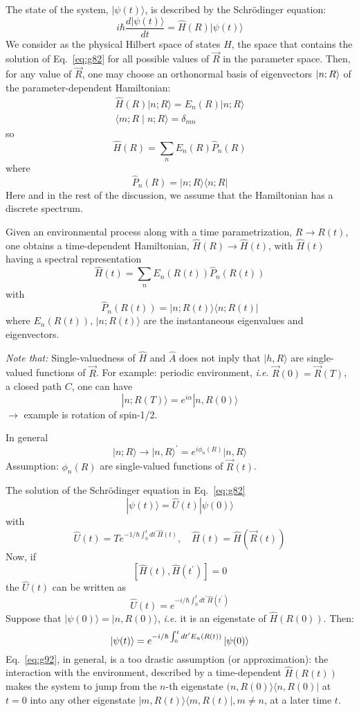 \documentclass[12pt]{article}
\newcommand{\be}{\begin{equation}}
\newcommand{\ee}{\end{equation}}
\begin{document}

The state of the system, $|\psi(t)\rangle$, is described by the
Schrödinger equation:
\be
i\hbar \frac{d|\psi(t)\rangle}{d t}=\hat{H}(R)|\psi(t)\rangle
\label{eq:g82}
\ee
We consider as the physical Hilbert space of states $H$,
the space that contains the solution of Eq.~\eqref{eq:g82}
for all possible values of $\vec{R}$ in the parameter
space. Then, for any value of $\vec{R}$, one may
choose an orthonormal basis of eigenvectors
$\ket{n;R}$ of the parameter-dependent Hamiltonian:
\be
\begin{gathered}
\hat{H}(R)|n ; R\rangle=E_{n}(R)|n ; R\rangle\\
\langle m ; R \mid n ; R\rangle=\delta_{m n}
\end{gathered}
\label{eq:g83}
\ee
so
\be
\hat{H}(R)=\sum_{n} E_{n}(R) \hat{P}_{n}(R)
\ee
where
\be
\hat{P}_{n}(R)=|n ; R\rangle\langle n ; R|
\ee
Here and in the rest of the discussion, we assume that
the Hamiltonian has a discrete spectrum.


Given an environmental process along with a time
parametrization, $R \rightarrow R(t)$, one obtains a time-dependent
Hamiltonian, $\hat{H}(R) \rightarrow \hat{H}(t)$, with $\hat{H}(t)$ having a
spectral representation
\be
\hat{H}(t)= \sum_n E_{n}(R(t)) \hat{P}_{n}(R(t))
\ee
with
\be
\hat{P}_{n}(R(t))=|n ; R(t)\rangle\langle n ; R(t)|
\ee
where $E_{n}(R(t)),\,|n ; R(t)\rangle$ are the instantaneous eigenvalues
and eigenvectors.

\emph{Note that:} Single-valuedness of $\hat{H}$ and $\hat{A}$ does not
inply that $|h, R\rangle$ are single-valued functions
of $\vec{R}$. For example: periodic environment, \textit{i.e}.
$\vec{R}(0)=\vec{R}(T)$, a closed path $C$, one can have
\be
|n ; R(T)\rangle=e^{i \alpha}|n, R(0)\rangle
\ee
$\rightarrow$ example is rotation of spin-1/2.

In general
\be
|n ; R\rangle \rightarrow|n, R\rangle^{\prime}=e^{i \phi_{n}(R)}|n, R\rangle
\label{eq:g89}
\ee
Assumption: $\phi_{n}(R)$ are single-valued functions of $\vec{R}(t)$.


The solution of the Schrödinger equation in Eq.~\eqref{eq:g82}
\be
|\psi(t)\rangle=\hat{U}(t)|\psi(0)\rangle
\ee
with
\be
\hat{U}(t) = T e^{-1 / \hbar \int_{0}^{t} d t^{\prime} \hat{H}(t)}, \quad \hat{H}(t)=\hat{H}(\vec{R}(t))
\ee
Now, if
\be
\left[\hat{H}(t), \hat{H}\left(t^{\prime}\right)\right]=0
\label{eq:g92}
\ee
the $\hat{U}(t)$ can be written as
\be
\hat{U}(t)=e^{-i / \hbar \int_{0}^{t} d t^{\prime} \hat{H}(t^\prime)}
\ee
Suppose that $|\psi(0)\rangle=|n, R(0)\rangle$, \textit{i.e.} it is an
eigenstate of $\hat{H}(R(0))$. Then:
\be
\ket{\psi(t)}=e^{-i / \hbar \int_{0}^{t} d t^{\prime} E_n(R(t))}\ket{\psi(0)}
\ee
Eq.~\eqref{eq:g92}, in general, is a too drastic assumption
(or approximation): the interaction with the environment,
described by a time-dependent $\hat{H}(R(t))$ makes
the system to jump from the $n$-th eigenstate
$(n, R(0)\rangle\langle n, R(0)|$ at $t=0$ into any other eigenstate
$|m, R(t)\rangle\langle m, R(t)|, m \neq n$, at a later time $t$.
\end{document}
